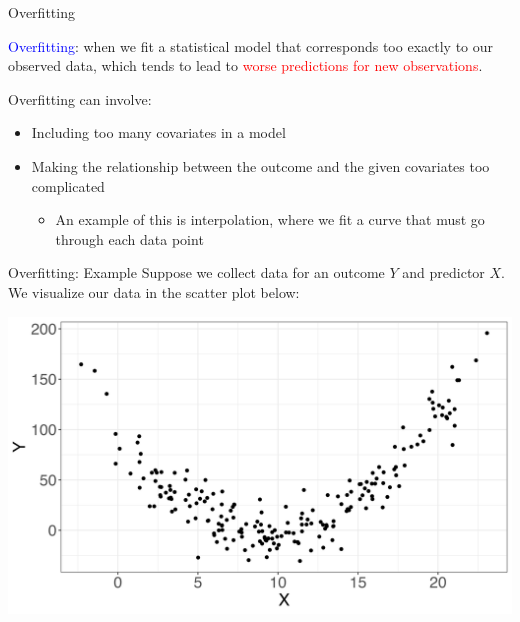 \documentclass[10pt,t]{beamer}
\begin{document}
\begin{frame}{Overfitting}

\textcolor{blue}{Overfitting}: when we fit a statistical model that corresponds too exactly to our observed data, which tends to lead to \textcolor{red}{worse predictions for new observations}.

\vspace{0.3cm}

Overfitting can involve:

\vspace{0.3cm}

\begin{itemize}
	\item Including too many covariates in a model 
	
	\medskip
	
	\item Making the relationship between the outcome and the given covariates too complicated
	\medskip
	
	\begin{itemize}
		\item An example of this is interpolation, where we fit a curve that must go through each data point
	\end{itemize}
\end{itemize}

\end{frame}

\begin{frame}{Overfitting: Example}
Suppose we collect data for an outcome $Y$ and predictor $X$. We visualize our data in the scatter plot below:

\vspace{0.3cm}

\centering \includegraphics[scale=0.4]{figures/overfit1.png}
\end{frame}
\end{document}
